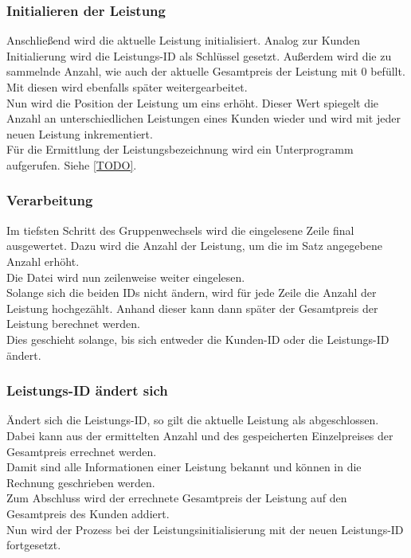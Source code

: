 \subsubsection{Initialieren der Leistung}
Anschließend wird die aktuelle Leistung initialisiert. Analog zur Kunden Initialierung wird die Leistungs-ID als Schlüssel gesetzt. Außerdem wird die zu sammelnde Anzahl, wie auch der aktuelle Gesamtpreis der Leistung mit 0 befüllt. Mit diesen wird ebenfalls später weitergearbeitet.\\
Nun wird die Position der Leistung um eins erhöht. Dieser Wert spiegelt die Anzahl an unterschiedlichen Leistungen eines Kunden wieder und wird mit jeder neuen Leistung inkrementiert.\\
Für die Ermittlung der Leistungsbezeichnung wird ein Unterprogramm aufgerufen. Siehe \ref{TODO}.\\

\subsubsection{Verarbeitung}
Im tiefsten Schritt des Gruppenwechsels wird die eingelesene Zeile final ausgewertet. Dazu wird die Anzahl der Leistung, um die im Satz angegebene Anzahl erhöht.\\
Die Datei wird nun zeilenweise weiter eingelesen.\\
Solange sich die beiden IDs nicht ändern, wird für jede Zeile die Anzahl der Leistung hochgezählt. Anhand dieser kann dann später der Gesamtpreis der Leistung berechnet werden.\\
Dies geschieht solange, bis sich entweder die Kunden-ID oder die Leistungs-ID ändert.

\subsubsection{Leistungs-ID ändert sich}\label{subsubsec:leistungs-id-aendert-sich}
Ändert sich die Leistungs-ID, so gilt die aktuelle Leistung als abgeschlossen. Dabei kann aus der ermittelten Anzahl und des gespeicherten Einzelpreises der Gesamtpreis errechnet werden.\\
Damit sind alle Informationen einer Leistung bekannt und können in die Rechnung geschrieben werden.\\
Zum Abschluss wird der errechnete Gesamtpreis der Leistung auf den Gesamtpreis des Kunden addiert.\\
Nun wird der Prozess bei der Leistungsinitialisierung mit der neuen Leistungs-ID fortgesetzt.\\

